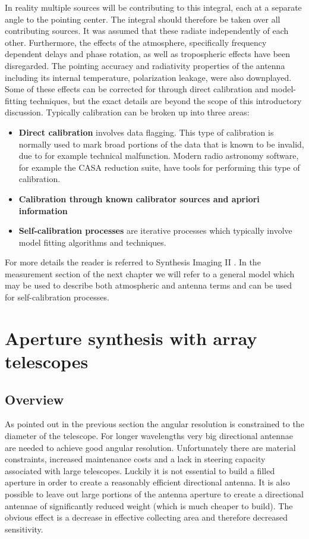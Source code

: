 In reality multiple sources will be contributing to this integral, each at a separate angle to the pointing center. The integral should therefore be taken over 
all contributing sources. It was assumed that these radiate independently of each other. Furthermore, the effects of the atmosphere, specifically frequency 
dependent delays and phase rotation, as well as tropospheric effects have been disregarded. The pointing accuracy and radiativity properties of the antenna including its internal 
temperature, polarization leakage, were also downplayed. Some of these effects can be corrected for through direct calibration and model-fitting techniques, 
but the exact details are beyond the scope of this introductory discussion. Typically calibration can be broken up into three areas:
\begin{itemize}
 \item \textbf{Direct calibration} involves data flagging. This type of calibration is normally used to mark broad portions of the data that is known to be invalid, due to for example
 technical malfunction. Modern radio astronomy software, for example the CASA reduction suite, have tools for performing this type of calibration.
 \item \textbf{Calibration through known calibrator sources and apriori information} 
 \item \textbf{Self-calibration processes} are iterative processes which typically involve model fitting algorithms and techniques.
\end{itemize}

For more details the reader is referred to Synthesis Imaging II \cite[Lectures 3, 5, 8 and 10]{taylor1999synthesis}. In the measurement section of the next chapter
we will refer to a general model which may be used to describe both atmospheric and antenna terms and can be used for self-calibration processes.

\section{Aperture synthesis with array telescopes}
\subsection{Overview}
As pointed out in the previous section the angular resolution is constrained to the diameter of the telescope. For longer 
wavelengths very big directional antennae are needed to achieve good angular resolution. Unfortunately 
there are material constraints, increased maintenance costs and a lack in steering capacity associated with large telescopes. 
Luckily it is not essential to build a filled aperture in order to create a reasonably efficient directional antenna. It is 
also possible to leave out large portions of the antenna aperture to create a directional antennae of significantly 
reduced weight (which is much cheaper to build). The obvious effect is a decrease in effective collecting area
and therefore decreased sensitivity.


